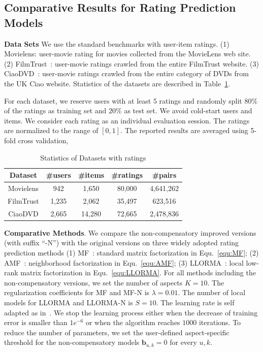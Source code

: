 \documentclass[letterpaper]{article} %
\begin{document}
\subsection{Comparative Results for Rating Prediction Models}

\textbf{Data Sets} We use the standard benchmarks with user-item ratings. (1) Movielens: user-movie rating for movies collected from the MovieLens web site. (2) FilmTrust~\cite{Guo2013Novel}: user-movie ratings crawled from the entire FilmTrust website. (3) CiaoDVD~\cite{Guo2014ETAF}: user-movie ratings crawled from the entire category of DVDs from the UK Ciao website. Statistics of the datasets are described in Table~\ref{tab:datasets}. 

For each dataset, we reserve users with at least $5$ ratings and randomly split $80\%$ of the ratings as training set and $20\%$ as test set. We avoid cold-start users and items. We consider each rating as an individual evaluation session. The ratings are normalized to the range of $[0,1]$. The reported results are averaged using 5-fold cross validation, 

\begin{table}[htp]
\tiny
\caption{Statistics of Datasets with ratings}
\begin{center}
\begin{tabular}{|c|c|c|c|c|}
\hline
Dataset & \#users & \#items & \#ratings & \#pairs \\\hline
Movielens &942 &1,650 &80,000 &4,641,262 \\\hline
FilmTrust &1,235 &2,062 &35,497 &623,516 \\\hline
CiaoDVD &2,665 &14,280 &72,665 &2,478,836 \\\hline
\end{tabular}
\end{center}
\label{tab:datasets}
\end{table}%
 

\textbf{Comparative Methods}. We compare the non-compensatory improved versions (with suffix ``-N'') with the original versions on three widely adopted rating prediction methods (1) MF~\cite{Koren2009Matrix}: standard matrix factorization in Equ.~\ref{equ:MF};  (2) AMF~\cite{Koren2008Factorization}: neighborhood factorization in Equ.~\ref{equ:AMF}; (3) LLORMA~\cite{Lee2013Local}: local low-rank matrix factorization in Equ.~\ref{equ:LLORMA}. For all methods including the non-compensatory versions, we set the number of aspects $K=10$. The regularization coefficients for MF and MF-N is $\lambda=0.01$. The number of local models for LLORMA and LLORMA-N is $S=10$. The learning rate is self adapted as in~\cite{Wilson2003general}.  We stop the learning process either when the decrease of training error is smaller than $1e^{-6}$ or when the algorithm reaches $1000$ iterations. To reduce the number of parameters, we set the user-defined aspect-specific threshold for the non-compensatory models $\mathbf{b}_{u,k}=0$ for every $u,k$. 
\end{document}
